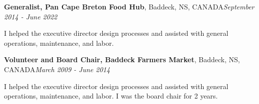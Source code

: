 \documentclass[letter,11pt]{article}
\newenvironment{noindentblock}{%
  \begin{list}{}{%
    \setlength{\leftmargin}{0in} %
    \setlength{\rightmargin}{.25in} %
    \setlength{\topsep}{0pt} %
    \setlength{\parsep}{0pt} %
  }
  \item[]}{\end{list}}
\begin{document}
\noindent
\textbf{Generalist, Pan Cape Breton Food Hub}, Baddeck, NS, CANADA\hfill \textit{September 2014 - June 2022}
\begin{noindentblock}
  I helped the executive director design processes and assisted with general operations, maintenance, and labor.
\end{noindentblock}

\noindent
\textbf{Volunteer and Board Chair, Baddeck Farmers Market}, Baddeck, NS, CANADA\hfill \textit{March 2009 - June 2014}
\begin{noindentblock}
  I helped the executive director design processes and assisted with general operations, maintenance, and labor. I was the board chair for 2 years.
\end{noindentblock}
\end{document}
